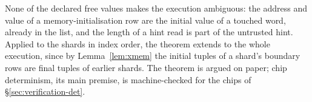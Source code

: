 None of the declared free values makes the execution ambiguous: the address and value of a memory-initialisation row are the initial value of a touched word, already in the list, and the length of a hint read is part of the untrusted hint. Applied to the shards in index order, the theorem extends to the whole execution, since by Lemma~\ref{lem:xmem} the initial tuples of a shard's boundary rows are final tuples of earlier shards. The theorem is argued on paper; chip determinism, its main premise, is machine-checked for the chips of \S\ref{sec:verification-det}.
